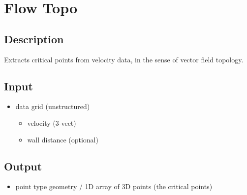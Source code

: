 \section{Flow Topo}
\label{sec:flow-topo}


\subsection{Description}
Extracts critical points from velocity data, in the sense of vector field topology.
 

\subsection{Input}
\begin{itemize}
\item
  data grid (unstructured)
  \begin{itemize}
  \item
    velocity (3-vect)
  \item
    wall distance (optional)
  \end{itemize}
\end{itemize}


\subsection{Output}
\begin{itemize}
\item
  point type geometry / 1D array of 3D points (the critical points)
\end{itemize}


